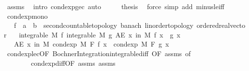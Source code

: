 \begin{isabellebody}
\ assms\ \isamarkupfalse%
\ {\isacharparenleft}{\kern0pt}intro\ cond{\isacharunderscore}{\kern0pt}exp{\isacharunderscore}{\kern0pt}ge{\isacharunderscore}{\kern0pt}c{\isacharparenright}{\kern0pt}\ auto\isanewline
\ \ \isamarkupfalse%
\ \isamarkupfalse%
\ {\isacharquery}{\kern0pt}thesis\ \isamarkupfalse%
\ {\isacharparenleft}{\kern0pt}force\ simp\ add{\isacharcolon}{\kern0pt}\ minus{\isacharunderscore}{\kern0pt}le{\isacharunderscore}{\kern0pt}iff{\isacharparenright}{\kern0pt}\isanewline
{}\isamarkupfalse%
%
\endisatagproof
{\isafoldproof}%
%
\isadelimproof
\isanewline
%
\endisadelimproof
\isanewline
{}\isamarkupfalse%
\ cond{\isacharunderscore}{\kern0pt}exp{\isacharunderscore}{\kern0pt}mono{\isacharcolon}{\kern0pt}\isanewline
\ \ \ f\ {\isacharcolon}{\kern0pt}{\isacharcolon}{\kern0pt}\ {\isachardoublequoteopen}{\isacharprime}{\kern0pt}a\ {\isasymRightarrow}\ {\isacharprime}{\kern0pt}b\ {\isacharcolon}{\kern0pt}{\isacharcolon}{\kern0pt}\ {\isacharbraceleft}{\kern0pt}second{\isacharunderscore}{\kern0pt}countable{\isacharunderscore}{\kern0pt}topology{\isacharcomma}{\kern0pt}\ banach{\isacharcomma}{\kern0pt}\ linorder{\isacharunderscore}{\kern0pt}topology{\isacharcomma}{\kern0pt}\ ordered{\isacharunderscore}{\kern0pt}real{\isacharunderscore}{\kern0pt}vector{\isacharbraceright}{\kern0pt}{\isachardoublequoteclose}\isanewline
\ \ \ {\isachardoublequoteopen}integrable\ M\ f{\isachardoublequoteclose}\ {\isachardoublequoteopen}integrable\ M\ g{\isachardoublequoteclose}\ {\isachardoublequoteopen}AE\ x\ in\ M{\isachardot}{\kern0pt}\ f\ x\ {\isasymle}\ g\ x{\isachardoublequoteclose}\isanewline
\ \ \ {\isachardoublequoteopen}AE\ x\ in\ M{\isachardot}{\kern0pt}\ cond{\isacharunderscore}{\kern0pt}exp\ M\ F\ f\ x\ {\isasymle}\ cond{\isacharunderscore}{\kern0pt}exp\ M\ F\ g\ x{\isachardoublequoteclose}\isanewline
%
\isadelimproof
\ \ %
\endisadelimproof
%
\isatagproof
{}\isamarkupfalse%
\ cond{\isacharunderscore}{\kern0pt}exp{\isacharunderscore}{\kern0pt}le{\isacharunderscore}{\kern0pt}c{\isacharbrackleft}{\kern0pt}OF\ Bochner{\isacharunderscore}{\kern0pt}Integration{\isachardot}{\kern0pt}integrable{\isacharunderscore}{\kern0pt}diff{\isacharcomma}{\kern0pt}\ OF\ assms{\isacharparenleft}{\kern0pt}{}{\isacharcomma}{\kern0pt}{}{\isacharparenright}{\kern0pt}{\isacharcomma}{\kern0pt}\ of\ {}{\isacharbrackright}{\kern0pt}\ \isanewline
\ \ \ \ \ \ \ \ cond{\isacharunderscore}{\kern0pt}exp{\isacharunderscore}{\kern0pt}diff{\isacharbrackleft}{\kern0pt}OF\ assms{\isacharparenleft}{\kern0pt}{}{\isacharcomma}{\kern0pt}{}{\isacharparenright}{\kern0pt}{\isacharbrackright}{\kern0pt}\ assms{\isacharparenleft}{\kern0pt}{}{\isacharparenright}{\kern0pt}\ \isamarkupfalse%

\end{isabellebody}
